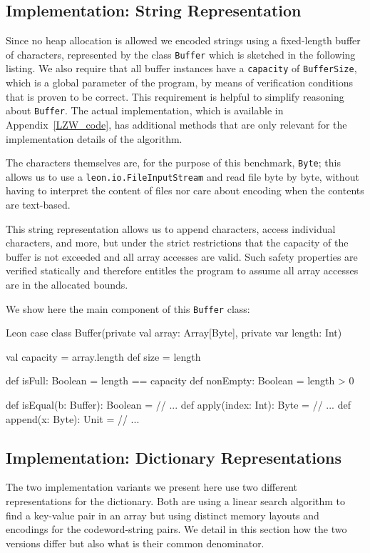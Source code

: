 \documentclass[a4paper,twoside]{article}
\newcommand{\InlineS}[1]{\lstinline[language=Leon]|#1|}
\newcommand{\RefApp}[1]{Appendix~\ref{#1}}
\begin{document}
\subsection{Implementation: String Representation}

Since no heap allocation is allowed we encoded strings using a fixed-length
buffer of characters, represented by the class \InlineS{Buffer} which is
sketched in the following listing. We also require that all buffer instances
have a \InlineS{capacity} of \InlineS{BufferSize}, which is a global parameter
of the program, by means of verification conditions that is proven to be
correct. This requirement is helpful to simplify reasoning about
\InlineS{Buffer}. The actual implementation, which is available in
\RefApp{LZW_code}, has additional methods that are only relevant for the
implementation details of the algorithm.

The characters themselves are, for the purpose of this benchmark,
\InlineS{Byte}; this allows us to use a \InlineS{leon.io.FileInputStream} and
read file byte by byte, without having to interpret the content of files nor
care about encoding when the contents are text-based.

This string representation allows us to append characters, access individual
characters, and more, but under the strict restrictions that the capacity of the
buffer is not exceeded and all array accesses are valid. Such safety properties
are verified statically and therefore entitles the program to assume all array
accesses are in the allocated bounds.

We show here the main component of this \InlineS{Buffer} class:
\begin{ShortCode}{Leon}
case class Buffer(private val array: Array[Byte], private var length: Int) {
  val capacity = array.length
  def size = length

  def isFull: Boolean = length == capacity
  def nonEmpty: Boolean = length > 0

  def isEqual(b: Buffer): Boolean = // ...
  def apply(index: Int): Byte = // ...
  def append(x: Byte): Unit = // ...
}
\end{ShortCode}

\subsection{Implementation: Dictionary Representations}
\label{lzw_dictionaries}

The two implementation variants we present here use two different
representations for the dictionary. Both are using a linear search algorithm to
find a key-value pair in an array but using distinct memory layouts and
encodings for the codeword-string pairs. We detail in this section how the two
versions differ but also what is their common denominator.
\end{document}
